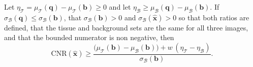 \begin{theorem}
Let $\eta_\mathcal{T} = \mu_\mathcal{T}(\mathbf{q}) - \mu_\mathcal{T}(\mathbf{b}) \ge 0$ and let
$\eta_\mathcal{B} \ge \mu_\mathcal{B}(\mathbf{q}) - \mu_\mathcal{B}(\mathbf{b})$. If
$\sigma_\mathcal{B}(\mathbf{q}) \le \sigma_\mathcal{B}(\mathbf{b})$, that
$\sigma_\mathcal{B}(\mathbf{b}) > 0$ and $\sigma_\mathcal{B}(\hat{\mathbf{x}}) > 0$ so that both
ratios are defined, that the tissue and background sets are the same for all three
images, and that the bounded numerator is non negative, then
\begin{equation}
\mathrm{CNR}(\hat{\mathbf{x}}) \ge
\frac{\big(\mu_\mathcal{T}(\mathbf{b}) - \mu_\mathcal{B}(\mathbf{b})\big)
      + w\,(\eta_\mathcal{T} - \eta_\mathcal{B})}{\sigma_\mathcal{B}(\mathbf{b})} .
\end{equation}
\end{theorem}

